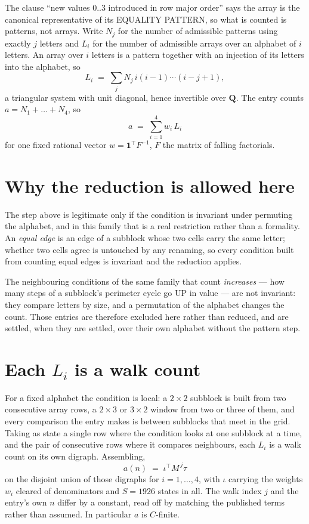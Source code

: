\documentclass[11pt,a4paper]{article}
\theoremstyle{plain}
\theoremstyle{definition}
\begin{document}
The clause ``new values $0..3$ introduced in row major order'' says the array is the
canonical representative of its EQUALITY PATTERN, so what is counted is patterns, not arrays.
Write $N_j$ for the number of admissible patterns using exactly $j$ letters and $L_i$ for the
number of admissible arrays over an alphabet of $i$ letters. An array over $i$ letters is a
pattern together with an injection of its letters into the alphabet, so
\[
L_i\;=\;\sum_j N_j\,i(i-1)\cdots(i-j+1),
\]
a triangular system with unit diagonal, hence invertible over $\mathbf{Q}$. The entry counts
$a=N_1+\dots+N_{4}$, so
\[
a\;=\;\sum_{i=1}^{4}w_i\,L_i
\]
for one fixed rational vector $w=\mathbf{1}^{\!\top}F^{-1}$, $F$ the matrix of falling
factorials.

\section{Why the reduction is allowed here}

The step above is legitimate only if the condition is invariant under permuting the alphabet,
and in this family that is a real restriction rather than a formality. An \emph{equal edge}
is an edge of a subblock whose two cells carry the same letter; whether two cells agree is
untouched by any renaming, so every condition built from counting equal edges is invariant and
the reduction applies.

The neighbouring conditions of the same family that count \emph{increases} --- how many steps
of a subblock's perimeter cycle go UP in value --- are not invariant: they compare letters by
size, and a permutation of the alphabet changes the count. Those entries are therefore excluded
here rather than reduced, and are settled, when they are settled, over their own alphabet
without the pattern step.

\section{Each $L_i$ is a walk count}

For a fixed alphabet the condition is local: a $2\times2$ subblock is built from two
consecutive array rows, a $2\times3$ or $3\times2$ window from two or three of them, and every
comparison the entry makes is between subblocks that meet in the grid. Taking as state a single
row where the condition looks at one subblock at a time, and the pair of consecutive rows where
it compares neighbours, each $L_i$ is a walk count on its own digraph. Assembling,
\[
a(n)\;=\;\iota^{\!\top}M^{\,j}\tau
\]
on the disjoint union of those digraphs for $i=1,\dots,4$, with $\iota$ carrying the weights
$w_i$ cleared of denominators and $S=1926$ states in all. The walk index $j$ and the entry's own
$n$ differ by a constant, read off by matching the published terms rather than assumed. In
particular $a$ is $C$-finite.
\end{document}
